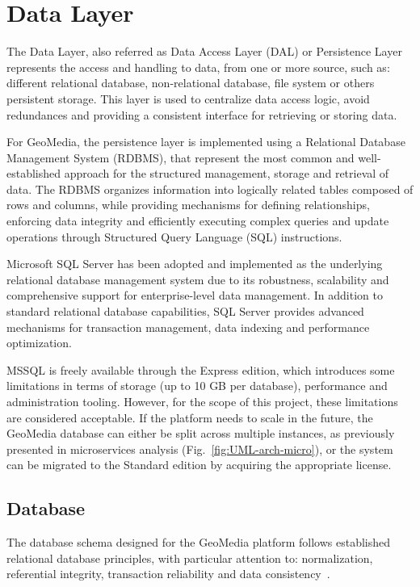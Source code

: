 \chapter{Data Layer}
\label{cap:datalayer}

The Data Layer, also referred as Data Access Layer (DAL) or Persistence Layer represents the access and handling to data, from one or more source, such as: different relational database, non-relational database, file system or others persistent storage. This layer is used to centralize data access logic, avoid redundances and providing a consistent interface for retrieving or storing data.

For GeoMedia, the persistence layer is implemented using a Relational Database Management System (RDBMS), that represent the most common and well-established approach for the structured management, storage and retrieval of data. The RDBMS organizes information into logically related tables composed of rows and columns, while providing mechanisms for defining relationships, enforcing data integrity and efficiently executing complex queries and update operations through Structured Query Language (SQL) instructions.

Microsoft SQL Server has been adopted and implemented as the underlying relational database management system due to its robustness, scalability and comprehensive support for enterprise-level data management. In addition to standard relational database capabilities, SQL Server provides advanced mechanisms for transaction management, data indexing and performance optimization.

MSSQL is freely available through the Express edition, which introduces some limitations in terms of storage (up to 10 GB per database), performance and administration tooling. However, for the scope of this project, these limitations are considered acceptable. If the platform needs to scale in the future, the GeoMedia database can either be split across multiple instances, as previously presented in microservices analysis (Fig.~\ref{fig:UML-arch-micro}), or the system can be migrated to the Standard edition by acquiring the appropriate license.

\section{Database}

The database schema designed for the GeoMedia platform follows established relational database principles, with particular attention to: normalization, referential integrity, transaction reliability and data consistency~\cite{article:db-principles}. 

